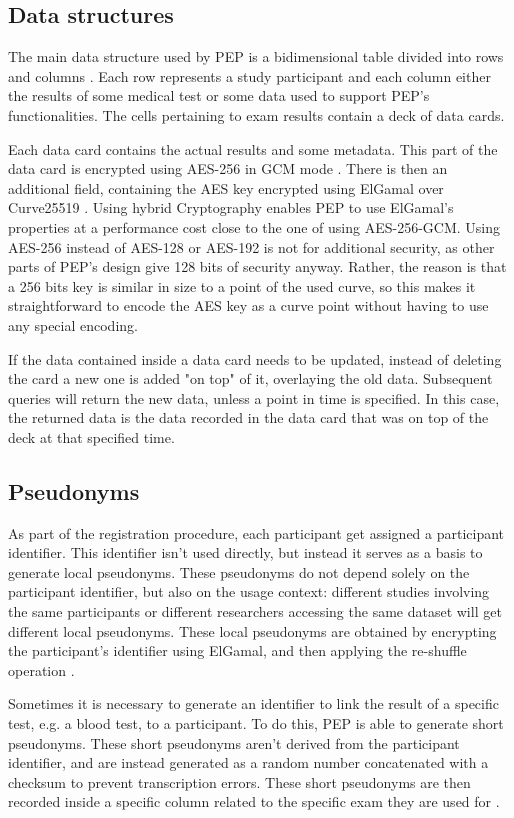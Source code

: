 \documentclass{report}
\begin{document}
\subsection{Data structures}
The main data structure used by PEP is a bidimensional table divided into rows and columns \cite{pep-blueprint}. Each row represents a study participant and each column either the 
results of some medical test or some data used to support PEP's functionalities. The cells pertaining to exam results contain a deck of data cards. \par
Each data card contains the actual results and some metadata. This part of the data card is encrypted using AES-256 \cite{AES-standard} in GCM mode \cite{GCM}. There is then an 
additional field, containing the AES key encrypted using ElGamal over Curve25519 \cite{elliptic-elgamal}. Using hybrid Cryptography enables PEP to use ElGamal's properties at a 
performance cost close to the one of using AES-256-GCM. Using AES-256 instead of AES-128 or AES-192 is not for additional security, as other parts of PEP's design give 128 bits of
security anyway. Rather, the reason is that a 256 bits key is similar in size to a point of the used curve, so this makes it straightforward to encode the AES key as a curve point
without having to use any special encoding.\par
If the data contained inside a data card needs to be updated, instead of deleting the card a new one is added "on top" of it, overlaying the old data. Subsequent queries will
return the new data, unless a point in time is specified. In this case, the returned data is the data recorded in the data card that was on top of the deck at that specified
time.

\subsection{Pseudonyms}
As part of the registration procedure, each participant get assigned a participant identifier. This identifier isn't used directly, but instead it serves as a basis to generate
local pseudonyms. These pseudonyms do not depend solely on the participant identifier, but also on the usage context: different studies involving the same participants or different
researchers accessing the same dataset will get different local pseudonyms. These local pseudonyms are obtained by encrypting the participant's identifier using ElGamal, and then
applying the re-shuffle operation \cite{pep-blueprint}. \par
Sometimes it is necessary to generate an identifier to link the result of a specific test, e.g. a blood test, to a participant. To do this, PEP is able to generate short
pseudonyms. These short pseudonyms aren't derived from the participant identifier, and are instead generated as a random number concatenated with a checksum to prevent
transcription errors. These short pseudonyms are then recorded inside a specific column related to the specific exam they are used for \cite{pep-blueprint}.
\end{document}
